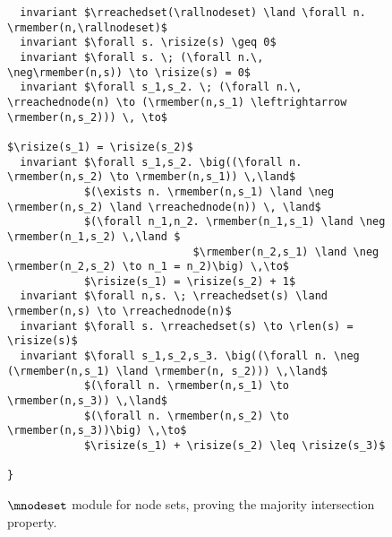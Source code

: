 \begin{figure}
\begin{lstlisting}
  invariant $\rreachedset(\rallnodeset) \land \forall n. \rmember(n,\rallnodeset)$
  invariant $\forall s. \risize(s) \geq 0$
  invariant $\forall s. \; (\forall n.\,  \neg\rmember(n,s)) \to \risize(s) = 0$
  invariant $\forall s_1,s_2. \; (\forall n.\, \rreachednode(n) \to (\rmember(n,s_1) \leftrightarrow \rmember(n,s_2))) \, \to$
                                                                                                $\risize(s_1) = \risize(s_2)$
  invariant $\forall s_1,s_2. \big((\forall n. \rmember(n,s_2) \to \rmember(n,s_1)) \,\land$
            $(\exists n. \rmember(n,s_1) \land \neg \rmember(n,s_2) \land \rreachednode(n)) \, \land$
            $(\forall n_1,n_2. \rmember(n_1,s_1) \land \neg \rmember(n_1,s_2) \,\land $
                             $\rmember(n_2,s_1) \land \neg \rmember(n_2,s_2) \to n_1 = n_2)\big) \,\to$
            $\risize(s_1) = \risize(s_2) + 1$
  invariant $\forall n,s. \; \rreachedset(s) \land \rmember(n,s) \to \rreachednode(n)$
  invariant $\forall s. \rreachedset(s) \to \rlen(s) = \risize(s)$
  invariant $\forall s_1,s_2,s_3. \big((\forall n. \neg (\rmember(n,s_1) \land \rmember(n, s_2))) \,\land$
            $(\forall n. \rmember(n,s_1) \to \rmember(n,s_3)) \,\land$
            $(\forall n. \rmember(n,s_2) \to \rmember(n,s_3))\big) \,\to$
            $\risize(s_1) + \risize(s_2) \leq \risize(s_3)$

}
\end{lstlisting}
\caption{\label{fig:nodeset}$\mnodeset$ module for node sets, proving the majority intersection property.}
\end{figure}
